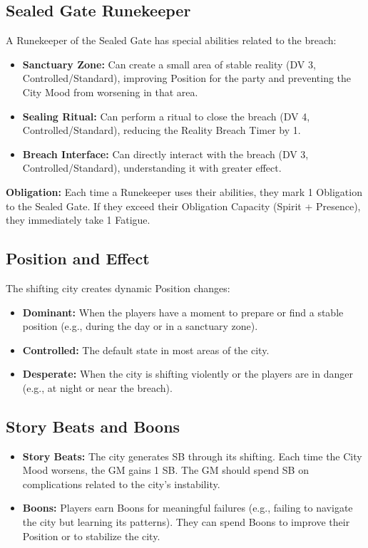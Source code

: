 \documentclass{article}
\begin{document}
\subsection{Sealed Gate Runekeeper}

A Runekeeper of the Sealed Gate has special abilities related to the breach:

\begin{itemize}
    \item \textbf{Sanctuary Zone:} Can create a small area of stable reality (DV 3, Controlled/Standard), improving Position for the party and preventing the City Mood from worsening in that area.
    \item \textbf{Sealing Ritual:} Can perform a ritual to close the breach (DV 4, Controlled/Standard), reducing the Reality Breach Timer by 1.
    \item \textbf{Breach Interface:} Can directly interact with the breach (DV 3, Controlled/Standard), understanding it with greater effect.
\end{itemize}

\textbf{Obligation:} Each time a Runekeeper uses their abilities, they mark 1 Obligation to the Sealed Gate. If they exceed their Obligation Capacity (Spirit + Presence), they immediately take 1 Fatigue.

\subsection{Position and Effect}

The shifting city creates dynamic Position changes:

\begin{itemize}
    \item \textbf{Dominant:} When the players have a moment to prepare or find a stable position (e.g., during the day or in a sanctuary zone).
    \item \textbf{Controlled:} The default state in most areas of the city.
    \item \textbf{Desperate:} When the city is shifting violently or the players are in danger (e.g., at night or near the breach).
\end{itemize}

\subsection{Story Beats and Boons}

\begin{itemize}
    \item \textbf{Story Beats:} The city generates SB through its shifting. Each time the City Mood worsens, the GM gains 1 SB. The GM should spend SB on complications related to the city's instability.
    \item \textbf{Boons:} Players earn Boons for meaningful failures (e.g., failing to navigate the city but learning its patterns). They can spend Boons to improve their Position or to stabilize the city.
\end{itemize}
\end{document}
